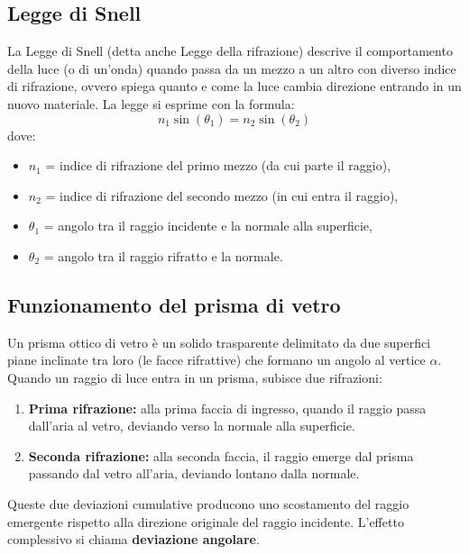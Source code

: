 \subsection{Legge di Snell}
La Legge di Snell (detta anche Legge della rifrazione) descrive il comportamento della luce (o di un'onda) quando passa da un mezzo a un altro con diverso indice di rifrazione, ovvero spiega quanto e come la luce cambia direzione entrando in un nuovo materiale. La legge si esprime con la formula:
\begin{equation}
	n_1\sin(\theta_1)=n_2\sin(\theta_2)
\end{equation}
dove:
\begin{itemize}
	\item $n_1$ = indice di rifrazione del primo mezzo (da cui parte il raggio),
	\item $n_2$ = indice di rifrazione del secondo mezzo (in cui entra il raggio),
	\item $\theta_1$ = angolo tra il raggio incidente e la normale alla superficie,
	\item $\theta_2$ = angolo tra il raggio rifratto e la normale.
\end{itemize}


\subsection{Funzionamento del prisma di vetro}
Un prisma ottico di vetro è un solido trasparente delimitato da due superfici piane inclinate tra loro (le facce rifrattive) che formano un angolo al vertice $\alpha$. Quando un raggio di luce entra in un prisma, subisce due rifrazioni:

\begin{enumerate}
	\item \textbf{Prima rifrazione:} alla prima faccia di ingresso, quando il raggio passa dall'aria al vetro, deviando verso la normale alla superficie.
	\item \textbf{Seconda rifrazione:} alla seconda faccia, il raggio emerge dal prisma passando dal vetro all'aria, deviando lontano dalla normale.
\end{enumerate}

Queste due deviazioni cumulative producono uno scostamento del raggio emergente rispetto alla direzione originale del raggio incidente. L'effetto complessivo si chiama \textbf{deviazione angolare}.

